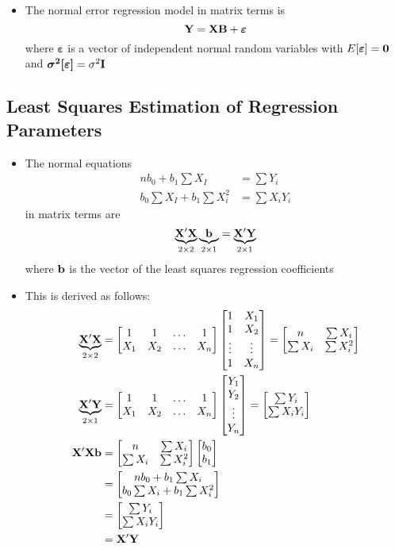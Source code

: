 \begin{itemize}
\item The normal error regression model in matrix terms is $$ \mathbf{Y} = \mathbf{XB} + \bm{\varepsilon} $$ where $\bm{\varepsilon}$ is a vector of independent normal random variables with $E[\bm{\varepsilon}] = \mathbf{0}$ and $\bm{\sigma^2[\varepsilon]} = \sigma^2\mathbf{I} $
\end{itemize} 

\subsection{Least Squares Estimation of Regression Parameters}
\begin{itemize}
\item The normal equations $$ \begin{aligned} nb_0 + b_1 \sum X_I &= \sum Y_i \\ b_0 \sum X_I + b_1 \sum X_i^2 &= \sum X_i Y_i \end{aligned} $$ in matrix terms are $$ \underbrace{\mathbf{X}'\mathbf{X}}_{2 \times 2} \underbrace{\mathbf{b}}_{2 \times 1} = \underbrace{\mathbf{X}'\mathbf{Y}}_{2 \times 1} $$ where $\mathbf{b}$ is the vector of the least squares regression coefficients
\item This is derived as follows: $$ \begin{aligned} \underbrace{\mathbf{X}'\mathbf{X}}_{2 \times 2} &= \begin{bmatrix} 1 & 1 & \hdots & 1 \\ X_1 & X_2 & \hdots & X_n \end{bmatrix} \begin{bmatrix} 1 & X_1 \\ 1 & X_2 \\ \vdots & \vdots \\ 1 & X_n \end{bmatrix} = \begin{bmatrix} n & \sum X_i \\ \sum X_i & \sum X_i^2 \end{bmatrix} \\ \underbrace{\mathbf{X}'\mathbf{Y}}_{2 \times 1} &= \begin{bmatrix}  1 & 1 & \hdots & 1 \\ X_1 & X_2 & \hdots & X_n \end{bmatrix}\begin{bmatrix} Y_1 \\ Y_2 \\ \vdots \\ Y_n \end{bmatrix} = \begin{bmatrix} \sum Y_i \\ \sum X_i Y_i \end{bmatrix}  \\ 
\mathbf{X}'\mathbf{X} \mathbf{b} &= \begin{bmatrix} n & \sum X_i \\ \sum X_i & \sum X_i^2 \end{bmatrix} \begin{bmatrix} b_0 \\ b_1 \end{bmatrix} \\ &= \begin{bmatrix} nb_0 + b_1 \sum X_i \\ b_0 \sum X_i + b_1 \sum X_i^2 \end{bmatrix} \\ &= \begin{bmatrix} \sum Y_i \\ \sum X_i Y_i \end{bmatrix} \\ &= \mathbf{X}'\mathbf{Y} \end{aligned} $$ 

\end{itemize}
